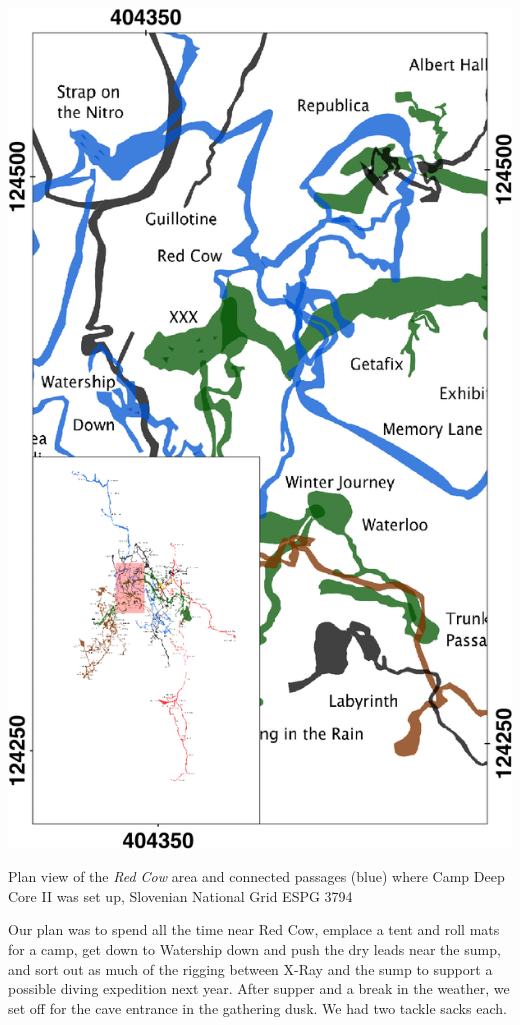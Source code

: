\begin{marginfigure}
\checkoddpage \ifoddpage \forcerectofloat \else \forceversofloat \fi
\centering
 \includegraphics[width=\linewidth]{2014/jarv-2014/red_cow_inset}
 \caption{Plan view of the \emph{Red Cow} area and connected passages (blue) where Camp Deep Core II was set up, Slovenian National Grid ESPG 3794}
 \label{Red Cow inset}
\end{marginfigure}


Our plan was to spend all the time near Red Cow, emplace a tent and roll mats for a camp, get down to Watership down and push the dry leads near the sump, and sort out as much of the rigging between X-Ray and the sump to support a possible diving expedition next year.
After supper and a break in the weather, we set off for the cave entrance in the gathering dusk. We had two tackle sacks each.

